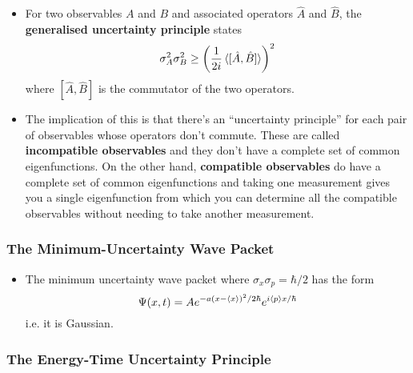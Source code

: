 \documentclass{article}
\begin{document}
\begin{itemize}
  \item For two observables $A$ and $B$ and associated operators $\hat{A}$ and $\hat{B}$, the \textbf{generalised uncertainty principle} states \[\sigma_A^2 \sigma_B^2 \ge \left( \frac{1}{2 i} \braket{[\hat{A}, \hat{B}]} \right)^2\] where $[\hat{A}, \hat{B}]$ is the commutator of the two operators.

  \item The implication of this is that there's an ``uncertainty principle'' for each pair of observables whose operators don't commute. These are called \textbf{incompatible observables} and they don't have a complete set of common eigenfunctions. On the other hand, \textbf{compatible observables} do have a complete set of common eigenfunctions and taking one measurement gives you a single eigenfunction from which you can determine all the compatible observables without needing to take another measurement.
\end{itemize}

\subsubsection{The Minimum-Uncertainty Wave Packet}

\begin{itemize}
  \item The minimum uncertainty wave packet where $\sigma_x \sigma_p = \hbar / 2$ has the form \[\Psi(x, t) = A e^{-a (x - \braket{x})^2 / 2 \hbar} e^{i \braket{p} x / \hbar}\] i.e. it is Gaussian.
\end{itemize}

\subsubsection{The Energy-Time Uncertainty Principle}
\end{document}

